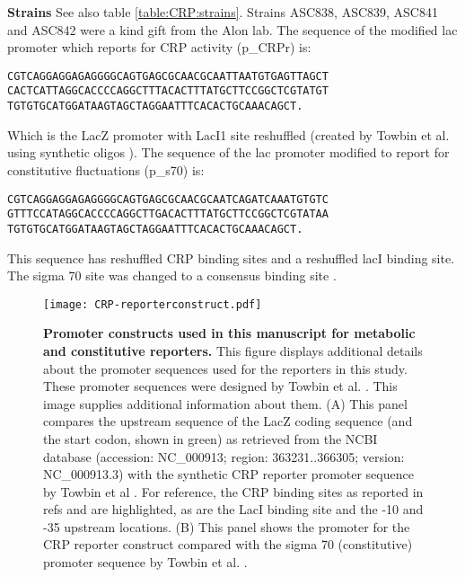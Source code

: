\textbf{Strains} See also table \ref{table:CRP:strains}. 
%
Strains ASC838, ASC839, ASC841 and ASC842 were a kind gift from the Alon lab. 
%
The sequence of the modified lac promoter which reports for CRP activity (p\_CRPr) is:
%
\begin{verbatim}
CGTCAGGAGGAGAGGGGCAGTGAGCGCAACGCAATTAATGTGAGTTAGCT
CACTCATTAGGCACCCCAGGCTTTACACTTTATGCTTCCGGCTCGTATGT
TGTGTGCATGGATAAGTAGCTAGGAATTTCACACTGCAAACAGCT.
\end{verbatim}
Which is the LacZ promoter with LacI1 site reshuffled (created by Towbin et al. using synthetic oligos \cite{Towbin2017}).
%
The sequence of the lac promoter modified to report for constitutive fluctuations (p\_s70) is:
\begin{verbatim}
CGTCAGGAGGAGAGGGGCAGTGAGCGCAACGCAATCAGATCAAATGTGTC
GTTTCCATAGGCACCCCAGGCTTGACACTTTATGCTTCCGGCTCGTATAA
TGTGTGCATGGATAAGTAGCTAGGAATTTCACACTGCAAACAGCT.
\end{verbatim}
This sequence has reshuffled CRP binding sites and a reshuffled lacI binding site. 
The sigma 70 site was changed to a consensus binding site \cite{Towbin2017}.
%
\begin{figure}
    \centering
    \texttt{[image: CRP-reporterconstruct.pdf]}
    \caption{ 
        \textbf{Promoter constructs used in this manuscript for metabolic and constitutive reporters.}
        This figure displays additional details about the promoter sequences used for the reporters in this study.
        These promoter sequences were designed by Towbin et al. \cite{Towbin2017}.
        This image supplies additional information about them.
        (A) This panel compares the upstream sequence of the LacZ coding sequence (and the start codon, shown in green) as retrieved from the NCBI database (accession: NC\_000913; region: 363231..366305; version: NC\_000913.3) with
        the synthetic CRP reporter promoter sequence by Towbin et al \cite{Towbin2017}.
        For reference, the CRP 
        binding sites as reported in refs \cite{Hudson1990} and \cite{Lawson2004} are highlighted, as are the LacI binding site and the -10 and -35 upstream locations.
        (B) This panel shows the promoter for the CRP reporter construct compared with the sigma 70 (constitutive) promoter sequence by Towbin et al. \cite{Towbin2017}.
    }        %
    \label{fig:CRP:promoterconstructs}
\end{figure}

